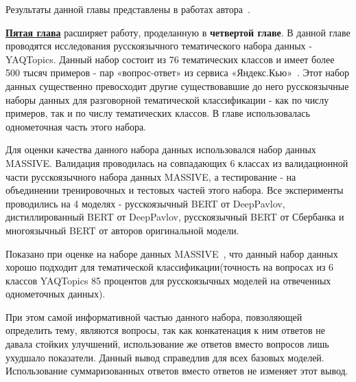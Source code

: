 Результаты данной главы представлены в работах автора~\cite{rumtl,enmtl}.

\underline{\textbf{Пятая глава}} расширяет работу, проделанную в \textbf{четвертой главе}. В данной главе проводятся исследования русскоязычного тематического набора данных - YAQTopics.  Данный набор состоит из 76 тематических классов и имеет более 500 тысяч примеров - пар «вопрос-ответ» из сервиса «Яндекс.Кью»~\cite{yandex_q}. Этот набор данных существенно превосходит другие существовавшие до него русскоязычные наборы данных для разговорной тематической классификации - как по числу примеров, так и по числу тематических классов. В главе использовалась однометочная часть этого набора. 

\begin{table}[t]
\centering
{}
\caption{Размеры набора данных {YAQTopics} по классу и части}
\label{tab:rutopics:sizes}
\end{table}

Для оценки качества данного набора данных использовался набор данных MASSIVE. Валидация проводилась на совпадающих 6 классах из валидационной части русскоязычного набора данных MASSIVE, а тестирование - на объединении тренировочных и тестовых частей этого набора. Все эксперименты проводились на 4 моделях - русскоязычный BERT от DeepPavlov, дистиллированный BERT от DeepPavlov, русскоязычный BERT от Сбербанка и многоязычный BERT от авторов оригинальной модели.

Показано при оценке на наборе данных MASSIVE~\cite{massive}, что данный набор данных хорошо подходит для тематической классификации(точность на вопросах из 6 классов {YAQTopics} 85 процентов для русскоязычных моделей на отвеченных однометочных данных). 

При этом самой информативной частью данного набора, повзоляющей определить тему, являются вопросы, так как конкатенация к ним ответов не давала стойких улучшений, использование же ответов вместо вопросов лишь ухудшало показатели. Данный вывод справедлив для всех базовых моделей. Использование суммаризованных ответов вместо ответов не изменяет этот вывод.

